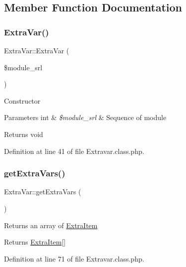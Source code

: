 \subsection{Member Function Documentation}
\hypertarget{classExtraVar_aa1f0e0f9cf917fde76581b5bf66afe18}{}\label{classExtraVar_aa1f0e0f9cf917fde76581b5bf66afe18} 
\subsubsection{\texorpdfstring{Extra\+Var()}{ExtraVar()}}
{\footnotesize\ttfamily Extra\+Var\+::\+Extra\+Var (\begin{DoxyParamCaption}\item[{}]{\$module\+\_\+srl }\end{DoxyParamCaption})}

Constructor


\begin{DoxyParams}[1]{Parameters}
int & {\em \$module\+\_\+srl} & Sequence of module \\
\hline
\end{DoxyParams}
\begin{DoxyReturn}{Returns}
void 
\end{DoxyReturn}


Definition at line 41 of file Extravar.\+class.\+php.

\hypertarget{classExtraVar_abe624f7d58678487a37176fe1175a060}{}\label{classExtraVar_abe624f7d58678487a37176fe1175a060} 
\subsubsection{\texorpdfstring{get\+Extra\+Vars()}{getExtraVars()}}
{\footnotesize\ttfamily Extra\+Var\+::get\+Extra\+Vars (\begin{DoxyParamCaption}{ }\end{DoxyParamCaption})}

Returns an array of \hyperlink{classExtraItem}{Extra\+Item}

\begin{DoxyReturn}{Returns}
\hyperlink{classExtraItem}{Extra\+Item}\mbox{[}\mbox{]} 
\end{DoxyReturn}


Definition at line 71 of file Extravar.\+class.\+php.

